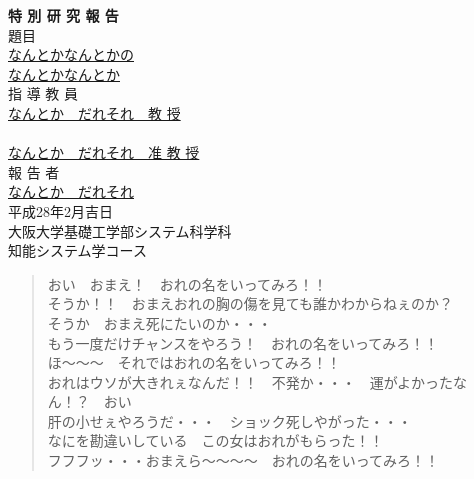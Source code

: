 \documentclass[a4j,12pt,oneside,openany]{jsbook}
\begin{document}
\thispagestyle{empty}
\begin{center}
\vspace*{5mm}
{\Huge {\bf 特 \hspace{12pt} 別 \hspace{12pt} 研 \hspace{12pt} 究 \hspace{12pt} 報 \hspace{12pt} 告}}\\
\vspace{2cm}
{\Large 題\hspace{8mm}目}\\
\vspace{1cm}
\underline{\LARGE{なんとかなんとかの}} \\
\vspace{0.5cm}
\underline{\LARGE{なんとかなんとか}} \\
\vspace{12mm}
{\large 指 導 教 員}\\
\vspace{6mm}
\underline{\Large なんとか　だれそれ　教 授}\\
　\\
\underline{\Large なんとか　だれそれ　准 教 授}\\
\vspace{8mm}
{\large 報 告 者}\\
\vspace{6mm}
\underline{\Large なんとか　だれそれ}\\
\vspace{10mm}
{\Large 平成28年2月吉日}\\
\vspace{14mm}
{\Large 大阪大学基礎工学部システム科学科\\知能システム学コース}\\
\end{center}
\clearpage
\setcounter{page}{0}

\begin{abstract}
おい　おまえ！　おれの名をいってみろ！！\\
そうか！！　おまえおれの胸の傷を見ても誰かわからねぇのか？\\
そうか　おまえ死にたいのか・・・\\
もう一度だけチャンスをやろう！　おれの名をいってみろ！！\\
ほ〜〜〜　それではおれの名をいってみろ！！\\
おれはウソが大きれぇなんだ！！　不発か・・・　運がよかったな　ん！？　おい\\
肝の小せぇやろうだ・・・　ショック死しやがった・・・\\
なにを勘違いしている　この女はおれがもらった！！\\
フフフッ・・・おまえら〜〜〜〜　おれの名をいってみろ！！\\
\end{abstract}
\end{document}

